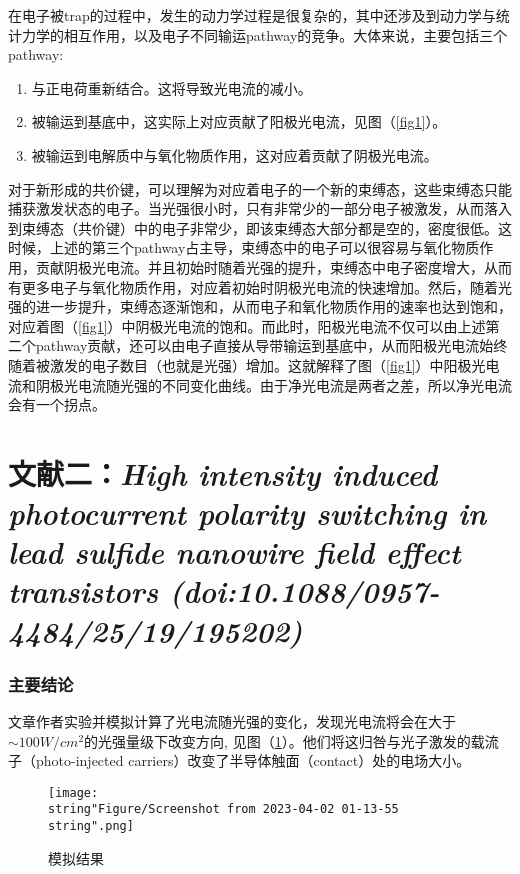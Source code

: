 \documentclass[english]{ctexart}
\begin{document}
在电子被trap的过程中，发生的动力学过程是很复杂的，其中还涉及到动力学与统计力学的相互作用，以及电子不同输运pathway的竞争。大体来说，主要包括三个pathway:
\begin{enumerate}
\item 与正电荷重新结合。这将导致光电流的减小。
\item 被输运到基底中，这实际上对应贡献了阳极光电流，见图（\ref{fig1}）。
\item 被输运到电解质中与氧化物质作用，这对应着贡献了阴极光电流。
\end{enumerate}
对于新形成的共价键，可以理解为对应着电子的一个新的束缚态，这些束缚态只能捕获激发状态的电子。当光强很小时，只有非常少的一部分电子被激发，从而落入到束缚态（共价键）中的电子非常少，即该束缚态大部分都是空的，密度很低。这时候，上述的第三个pathway占主导，束缚态中的电子可以很容易与氧化物质作用，贡献阴极光电流。并且初始时随着光强的提升，束缚态中电子密度增大，从而有更多电子与氧化物质作用，对应着初始时阴极光电流的快速增加。然后，随着光强的进一步提升，束缚态逐渐饱和，从而电子和氧化物质作用的速率也达到饱和，对应着图（\ref{fig1}）中阴极光电流的饱和。而此时，阳极光电流不仅可以由上述第二个pathway贡献，还可以由电子直接从导带输运到基底中，从而阳极光电流始终随着被激发的电子数目（也就是光强）增加。这就解释了图（\ref{fig1}）中阳极光电流和阴极光电流随光强的不同变化曲线。由于净光电流是两者之差，所以净光电流会有一个拐点。

\part{文献二：\emph{High intensity induced photocurrent polarity switching
in lead sulfide nanowire field effect transistors (doi:10.1088/0957-4484/25/19/195202)}}

\section{主要结论}

文章作者实验并模拟计算了光电流随光强的变化，发现光电流将会在大于$\sim100W/cm^{2}$的光强量级下改变方向, 见图（\ref{fig3}）。他们将这归咎与光子激发的载流子（photo-injected
carriers）改变了半导体触面（contact）处的电场大小。

\begin{figure}
\texttt{[image: \\string"Figure/Screenshot from 2023-04-02 01-13-55\\string".png]}

\caption{模拟结果}

\label{fig3}
\end{figure}
\end{document}
